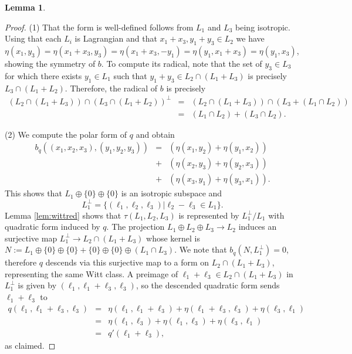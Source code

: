 \documentclass{article}
\newtheorem{lem}[thm]{Lemma}
\theoremstyle{definition}
\numberwithin{equation}{subsection}
\renewcommand{\-}{\hyp{}}
\begin{document}
\begin{appendices}
\begin{lem}
\end{lem}
\begin{proof}
	(1) That the form is well-defined follows from $L_1$ and $L_3$ being isotropic. Using that each $L_i$ is Lagrangian and that $x_1+x_3,y_1+y_3 \in L_2$ we have $\eta(x_1,y_3)=\eta(x_1+x_3,y_3)=\eta(x_1+x_3,-y_1)=\eta(y_1,x_1+x_3)=\eta(y_1,x_3)$, showing the symmetry of $b$. To compute its radical, note that the set of $y_3 \in L_3$ for which there exists $y_1 \in L_1$ such that $y_1+y_3 \in L_2 \cap (L_1+L_3)$ is precisely $L_3 \cap (L_1+L_2)$. Therefore, the radical of $b$ is precisely 
	\begin{eqnarray*}
	(L_2 \cap (L_1+L_3)) \cap (L_3 \cap (L_1+L_2))^\perp&=& (L_2 \cap (L_1+L_3)) \cap (L_3 + (L_1 \cap L_2))\\
	&=&(L_1 \cap L_2) + (L_3 \cap L_2).	
	\end{eqnarray*}


	(2) We compute the polar form of $q$ and obtain
	\begin{eqnarray*}
	b_q((x_1,x_2,x_3),(y_1,y_2,y_3))&=&(\eta(x_1,y_2)+\eta(y_1,x_2))\\
	&+&(\eta(x_2,y_3)+\eta(y_2,x_3))\\
	&+&(\eta(x_3,y_1)+\eta(y_3,x_1)).\end{eqnarray*}
	This shows that $L_1 \oplus \{0\} \oplus \{0\}$ is an isotropic subspace and 
	\[ L_1^\perp=\{(\ell_1,\ell_2,\ell_3)|\ell_2-\ell_3 \in L_1\}. \]
	Lemma \ref{lem:wittred} shows that $\tau(L_1,L_2,L_3)$ is represented by $L_1^\perp/L_1$ with quadratic form induced by $q$. The projection $L_1 \oplus L_2 \oplus L_3 \to L_2$ induces an surjective map $L_1^\perp \to L_2 \cap (L_1+L_3)$ whose kernel is $N:=L_1 \oplus\{0\} \oplus\{0\} + \{0\} \oplus \{0\} \oplus (L_1 \cap L_3)$. We note that $b_q(N,L_1^\perp)=0$, therefore $q$ descends via this surjective map to a form on $L_2 \cap (L_1 + L_3)$, representing the same Witt class. A preimage of $\ell_1+\ell_3\in L_2 \cap (L_1+L_3)$ in $L_1^\perp$ is given by $(\ell_1,\ell_1+\ell_3,\ell_3)$, so the descended quadratic form sends $\ell_1+\ell_3$ to
	\begin{eqnarray*}
		q(\ell_1,\ell_1+\ell_3,\ell_3)
		&=&\eta(\ell_1,\ell_1+\ell_3)+\eta(\ell_1+\ell_3,\ell_3)+\eta(\ell_3,\ell_1)\\
		&=&\eta(\ell_1,\ell_3)+\eta(\ell_1,\ell_3)+\eta(\ell_3,\ell_1)\\
		&=&q'(\ell_1+\ell_3),
	\end{eqnarray*}
	as claimed. 
\end{proof}




\end{appendices}
\end{document}
